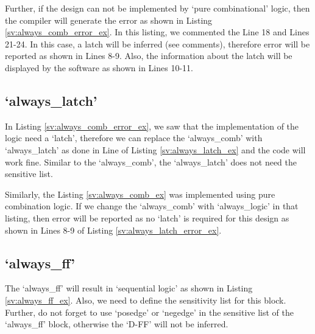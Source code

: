 
	
Further, if the design can not be implemented by `pure combinational' logic, then the compiler will generate the error as shown in Listing \ref{sv:always_comb_error_ex}. In this listing, we commented the Line 18 and Lines 21-24. In this case, a latch will be inferred (see comments), therefore error will be reported as shown in Lines 8-9. Also, the information about the latch will be displayed by the software as shown in Lines 10-11.  
	



\subsection{`always\_latch'}
In Listing \ref{sv:always_comb_error_ex}, we saw that the implementation of the logic need a `latch', therefore we can replace the `always\_comb' with `always\_latch' as done in Line of Listing \ref{sv:always_latch_ex} and the code will work fine. Similar to the `always\_comb', the `always\_latch' does not need the sensitive list. 




Similarly, the Listing \ref{sv:always_comb_ex} was implemented using pure combination logic. If we change the `always\_comb' with `always\_logic' in that listing, then error will be reported as no `latch' is required for this design as shown in Lines 8-9 of Listing \ref{sv:always_latch_error_ex}. 



\subsection{`always\_ff'}
The `always\_ff' will result in `sequential logic' as shown in Listing \ref{sv:always_ff_ex}. Also, we need to define the sensitivity list for this block. Further, do not forget to use `posedge' or `negedge' in the sensitive list of the `always\_ff' block, otherwise the `D-FF' will not be inferred. 

